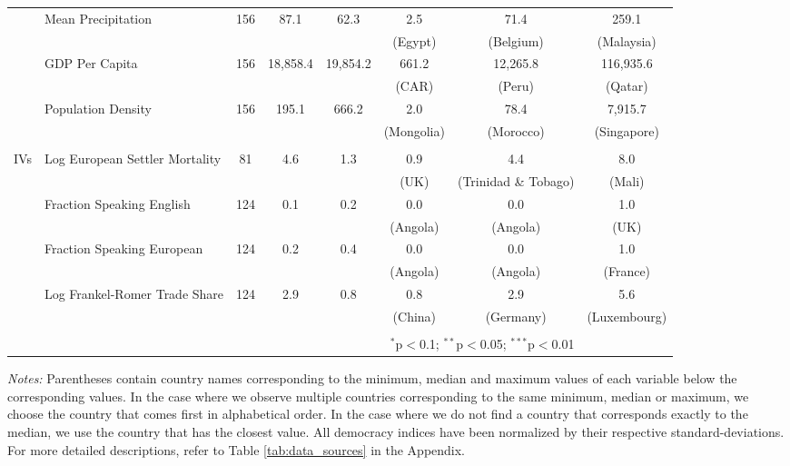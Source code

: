\begin{landscape}
\begin{table}[!htbp]
\begin{threeparttable}
\begin{tabular}{@{\extracolsep{0pt}}llcccccc}
& Mean Precipitation & 156 & 87.1 & 62.3 & 2.5 & 71.4 & 259.1 \\ 
& & & & & (Egypt) & (Belgium) & (Malaysia)\\
& GDP Per Capita & 156 & 18,858.4 & 19,854.2 & 661.2 & 12,265.8 & 116,935.6 \\ 
& & & & & (CAR) & (Peru) & (Qatar) \\
& Population Density & 156 & 195.1 & 666.2 & 2.0 & 78.4 & 7,915.7 \\ 
& & & & & (Mongolia) & (Morocco) & (Singapore)\\\hline \\[-1.8ex] 
IVs & Log European Settler Mortality & 81 & 4.6 & 1.3 & 0.9 & 4.4 & 8.0 \\ 
& & & & & (UK) & (Trinidad \& Tobago) & (Mali) \\
& Fraction Speaking English & 124 & 0.1 & 0.2 & 0.0 & 0.0 & 1.0 \\ 
& & & & & (Angola) & (Angola) & (UK) \\
& Fraction Speaking European & 124 & 0.2 & 0.4 & 0.0 & 0.0 & 1.0 \\ 
& & & & & (Angola) & (Angola) & (France) \\
& Log Frankel-Romer Trade Share & 124 & 2.9 & 0.8 & 0.8 & 2.9 & 5.6 \\ 
& & & & & (China) & (Germany) & (Luxembourg) \\
\hline \\[-1.8ex] 
 & \multicolumn{6}{r}{$^{*}$p$<$0.1; $^{**}$p$<$0.05; $^{***}$p$<$0.01} \\
\end{tabular} 

\begin{tablenotes}
            \item{\textit{Notes:}} Parentheses contain country names corresponding to the minimum, median and maximum values of each variable below the corresponding values. In the case where we observe multiple countries corresponding to the same minimum, median or maximum, we choose the country that comes first in alphabetical order. In the case where we do not find a country that corresponds exactly to the median, we use the country that has the closest value.  All democracy indices have been normalized by their respective standard-deviations. For more detailed descriptions, refer to Table \ref{tab:data_sources} in the Appendix.
        \end{tablenotes}
\end{threeparttable}
\end{table}  
\end{landscape}

